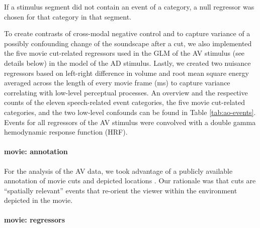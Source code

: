 \documentclass[english]{article}
\begin{document}
If a stimulus segment did not contain an event of a category, a null regressor
was chosen for that category in that segment.

To create contrasts of cross-modal negative control and to capture variance of a
possibly confounding change of the soundscape after a cut, we also implemented
the five movie cut-related regressors used in the GLM of the AV stimulus (see
details below) in the model of the AD stimulus.
%
Lastly, we created two nuisance regressors based on left-right difference in
volume and root mean square energy averaged across the length of every movie
frame (\unit[40]{ms}) to capture variance correlating with low-level perceptual
processes.
An overview and the respective counts of the eleven speech-related event
categories, the five movie cut-related categories, and the two low-level
confounds can be found in Table \ref{tab:ao-events}.
Events for all regressors of the AV stimulus were convolved with a
double gamma hemodynamic response function (HRF).


\paragraph{movie: annotation}

For the analysis of the AV data, we took advantage of a publicly available
annotation of movie cuts and depicted locations \citep{haeusler2016cutanno}.
Our rationale was that cuts are ``spatially relevant'' events that re-orient the
viewer within the environment depicted in the movie.



\paragraph{movie: regressors}
\end{document}
